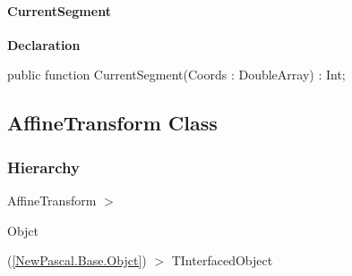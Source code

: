 \documentclass{report}
\newif\ifpdf
\begin{document}
\paragraph*{CurrentSegment}\hspace*{\fill}

\label{NewPascal.GUI.Geom.PathIterator-CurrentSegment}
\begin{list}{}{
\setlength{\itemindent}{0cm}
\setlength{\listparindent}{0cm}
\setlength{\leftmargin}{\evensidemargin}
\addtolength{\leftmargin}{\tmplength}
\settowidth{\labelsep}{X}
\addtolength{\leftmargin}{\labelsep}
\setlength{\labelwidth}{\tmplength}
}
\item[\textbf{Declaration}\hfill]
\ifpdf
\begin{flushleft}
\fi
\begin{ttfamily}
public function CurrentSegment(Coords : DoubleArray) : Int;\end{ttfamily}

\ifpdf
\end{flushleft}
\fi

\end{list}
\ifpdf
\subsection*{\large{\textbf{AffineTransform Class}}\normalsize\hspace{1ex}\hrulefill}
\else
\subsection*{AffineTransform Class}
\fi
\label{NewPascal.GUI.Geom.AffineTransform}
\subsubsection*{\large{\textbf{Hierarchy}}\normalsize\hspace{1ex}\hfill}
AffineTransform {$>$} \begin{ttfamily}Objct\end{ttfamily}(\ref{NewPascal.Base.Objct}) {$>$} 
TInterfacedObject
\end{document}
